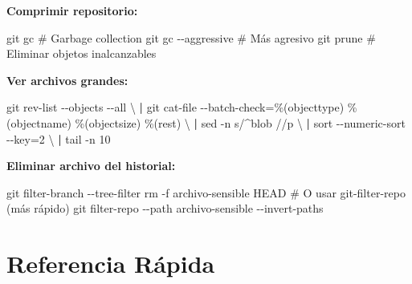 \documentclass[
  doc,
  floatsintext,
  longtable,
  a4paper,
  nolmodern,
  notxfonts,
  notimes,
  12pt,
  colorlinks=true,linkcolor=blue,citecolor=blue,urlcolor=blue]{apa7}
\newenvironment{Shaded}{\begin{snugshade}}{\end{snugshade}}
\newcommand{\AttributeTok}[1]{\textcolor[rgb]{0.40,0.45,0.13}{#1}}
\newcommand{\CommentTok}[1]{\textcolor[rgb]{0.37,0.37,0.37}{#1}}
\newcommand{\DataTypeTok}[1]{\textcolor[rgb]{0.68,0.00,0.00}{#1}}
\newcommand{\FunctionTok}[1]{\textcolor[rgb]{0.28,0.35,0.67}{#1}}
\newcommand{\KeywordTok}[1]{\textcolor[rgb]{0.00,0.23,0.31}{\textbf{#1}}}
\newcommand{\NormalTok}[1]{\textcolor[rgb]{0.00,0.23,0.31}{#1}}
\newcommand{\OperatorTok}[1]{\textcolor[rgb]{0.37,0.37,0.37}{#1}}
\newcommand{\StringTok}[1]{\textcolor[rgb]{0.13,0.47,0.30}{#1}}
\begin{document}
\textbf{Comprimir repositorio:}

\begin{Shaded}
\begin{Highlighting}[]
\FunctionTok{git}\NormalTok{ gc               }\CommentTok{\# Garbage collection}
\FunctionTok{git}\NormalTok{ gc }\AttributeTok{{-}{-}aggressive}  \CommentTok{\# Más agresivo}
\FunctionTok{git}\NormalTok{ prune            }\CommentTok{\# Eliminar objetos inalcanzables}
\end{Highlighting}
\end{Shaded}

\textbf{Ver archivos grandes:}

\begin{Shaded}
\begin{Highlighting}[]
\FunctionTok{git}\NormalTok{ rev{-}list }\AttributeTok{{-}{-}objects} \AttributeTok{{-}{-}all} \DataTypeTok{\textbackslash{}}
  \KeywordTok{|} \FunctionTok{git}\NormalTok{ cat{-}file }\AttributeTok{{-}{-}batch{-}check}\OperatorTok{=}\StringTok{\textquotesingle{}\%(objecttype) \%(objectname) \%(objectsize) \%(rest)\textquotesingle{}} \DataTypeTok{\textbackslash{}}
  \KeywordTok{|} \FunctionTok{sed} \AttributeTok{{-}n} \StringTok{\textquotesingle{}s/\^{}blob //p\textquotesingle{}} \DataTypeTok{\textbackslash{}}
  \KeywordTok{|} \FunctionTok{sort} \AttributeTok{{-}{-}numeric{-}sort} \AttributeTok{{-}{-}key}\OperatorTok{=}\NormalTok{2 }\DataTypeTok{\textbackslash{}}
  \KeywordTok{|} \FunctionTok{tail} \AttributeTok{{-}n}\NormalTok{ 10}
\end{Highlighting}
\end{Shaded}

\textbf{Eliminar archivo del historial:}

\begin{Shaded}
\begin{Highlighting}[]
\FunctionTok{git}\NormalTok{ filter{-}branch }\AttributeTok{{-}{-}tree{-}filter} \StringTok{\textquotesingle{}rm {-}f archivo{-}sensible\textquotesingle{}}\NormalTok{ HEAD}
\CommentTok{\# O usar git{-}filter{-}repo (más rápido)}
\FunctionTok{git}\NormalTok{ filter{-}repo }\AttributeTok{{-}{-}path}\NormalTok{ archivo{-}sensible }\AttributeTok{{-}{-}invert{-}paths}
\end{Highlighting}
\end{Shaded}

\section{Referencia Rápida}\label{referencia-ruxe1pida}
\end{document}

